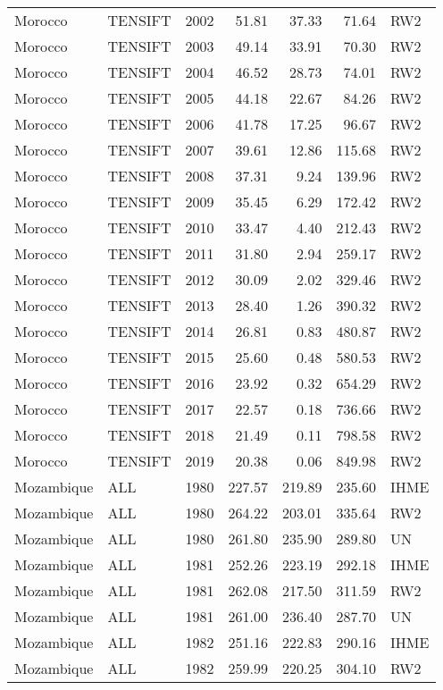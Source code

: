 \begin{longtable}{lllrrrl}
  Morocco & TENSIFT & 2002 & 51.81 & 37.33 & 71.64 & RW2 \\ 
  Morocco & TENSIFT & 2003 & 49.14 & 33.91 & 70.30 & RW2 \\ 
  Morocco & TENSIFT & 2004 & 46.52 & 28.73 & 74.01 & RW2 \\ 
  Morocco & TENSIFT & 2005 & 44.18 & 22.67 & 84.26 & RW2 \\ 
  Morocco & TENSIFT & 2006 & 41.78 & 17.25 & 96.67 & RW2 \\ 
  Morocco & TENSIFT & 2007 & 39.61 & 12.86 & 115.68 & RW2 \\ 
  Morocco & TENSIFT & 2008 & 37.31 & 9.24 & 139.96 & RW2 \\ 
  Morocco & TENSIFT & 2009 & 35.45 & 6.29 & 172.42 & RW2 \\ 
  Morocco & TENSIFT & 2010 & 33.47 & 4.40 & 212.43 & RW2 \\ 
  Morocco & TENSIFT & 2011 & 31.80 & 2.94 & 259.17 & RW2 \\ 
  Morocco & TENSIFT & 2012 & 30.09 & 2.02 & 329.46 & RW2 \\ 
  Morocco & TENSIFT & 2013 & 28.40 & 1.26 & 390.32 & RW2 \\ 
  Morocco & TENSIFT & 2014 & 26.81 & 0.83 & 480.87 & RW2 \\ 
  Morocco & TENSIFT & 2015 & 25.60 & 0.48 & 580.53 & RW2 \\ 
  Morocco & TENSIFT & 2016 & 23.92 & 0.32 & 654.29 & RW2 \\ 
  Morocco & TENSIFT & 2017 & 22.57 & 0.18 & 736.66 & RW2 \\ 
  Morocco & TENSIFT & 2018 & 21.49 & 0.11 & 798.58 & RW2 \\ 
  Morocco & TENSIFT & 2019 & 20.38 & 0.06 & 849.98 & RW2 \\ 
  Mozambique & ALL & 1980 & 227.57 & 219.89 & 235.60 & IHME \\ 
  Mozambique & ALL & 1980 & 264.22 & 203.01 & 335.64 & RW2 \\ 
  Mozambique & ALL & 1980 & 261.80 & 235.90 & 289.80 & UN \\ 
  Mozambique & ALL & 1981 & 252.26 & 223.19 & 292.18 & IHME \\ 
  Mozambique & ALL & 1981 & 262.08 & 217.50 & 311.59 & RW2 \\ 
  Mozambique & ALL & 1981 & 261.00 & 236.40 & 287.70 & UN \\ 
  Mozambique & ALL & 1982 & 251.16 & 222.83 & 290.16 & IHME \\ 
  Mozambique & ALL & 1982 & 259.99 & 220.25 & 304.10 & RW2 \\ 

\end{longtable}
